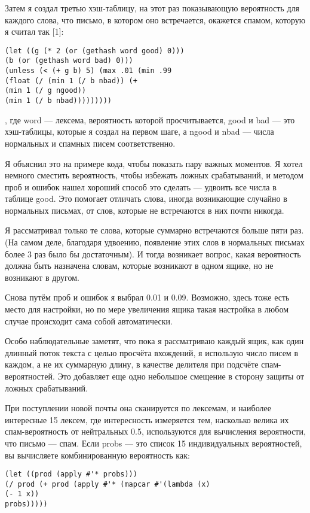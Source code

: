 \documentclass[ebook,12pt,oneside,openany]{memoir}
\begin{document}
Затем я создал третью хэш-таблицу, на этот раз показывающую
вероятность для каждого слова, что письмо, в котором оно встречается,
окажется спамом, которую я считал так [1]:

\begin{verbatim}
(let ((g (* 2 (or (gethash word good) 0)))
(b (or (gethash word bad) 0)))
(unless (< (+ g b) 5) (max .01 (min .99
(float (/ (min 1 (/ b nbad)) (+
(min 1 (/ g ngood))
(min 1 (/ b nbad)))))))))
\end{verbatim}

, где word — лексема, вероятность которой просчитывается, good и bad —
это хэш-таблицы, которые я создал на первом шаге, а ngood и nbad —
числа нормальных и спамных писем соответственно.

Я объяснил это на примере кода, чтобы показать пару важных моментов. Я
хотел немного сместить вероятность, чтобы избежать ложных
срабатываний, и методом проб и ошибок нашел хороший способ это сделать
— удвоить все числа в таблице good. Это помогает отличать слова,
иногда возникающие случайно в нормальных письмах, от слов, которые не
встречаются в них почти никогда.

Я рассматривал только те слова, которые суммарно встречаются больше
пяти раз. (На самом деле, благодаря удвоению, появление этих слов в
нормальных письмах более 3 раз было бы достаточным). И тогда возникает
вопрос, какая вероятность должна быть назначена словам, которые
возникают в одном ящике, но не возникают в другом.

Снова путём проб и ошибок я выбрал 0.01 и 0.09. Возможно, здесь тоже
есть место для настройки, но по мере увеличения ящика такая настройка
в любом случае происходит сама собой автоматически.

Особо наблюдательные заметят, что пока я рассматриваю каждый ящик, как
один длинный поток текста с целью просчёта вхождений, я использую
число писем в каждом, а не их суммарную длину, в качестве делителя при
подсчёте спам-вероятностей. Это добавляет еще одно небольшое смещение
в сторону защиты от ложных срабатываний.

При поступлении новой почты она сканируется по лексемам, и наиболее
интересные 15 лексем, где интересность измеряется тем, насколько
велика их спам-вероятность от нейтральных 0.5, используются для
вычисления вероятности, что письмо — спам. Если probs — это список 15
индивидуальных вероятностей, вы вычисляете комбинированную вероятность
как:
\begin{verbatim}
(let ((prod (apply #'* probs)))
(/ prod (+ prod (apply #'* (mapcar #'(lambda (x)
(- 1 x))
probs)))))
\end{verbatim}
\end{document}
